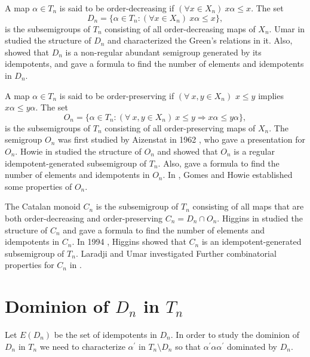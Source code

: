 \documentclass[10pt]{extarticle}
\numberwithin{equation}{section}
\numberwithin{bbb}{section}
\numberwithin{equation}{section}
\begin{document}
A map $\alpha \in T_n$ is said to be order-decreasing if $(\forall x \in X_n) \  x\alpha \leq x$. The set
$$D_n=\{\alpha \in T_n: (\forall x\in X_n) \ x\alpha\leq x\},$$ 
is the subsemigroups of $T_n$ consisting of all order-decreasing maps of $X_n$. Umar in \cite{15} studied the structure of $D_n$ and characterized the Green's relations in it. Also, showed that $D_n$ is a non-regular abundant semigroup generated by its idempotents, and gave a formula to find the number of elements and idempotents in $D_n$.

A map $\alpha \in T_n$ is said to be  order-preserving if $(\forall \ x,y \in X_n)$ $x \leq y$ implies $x\alpha \leq y\alpha$. The set
$$O_n=\{\alpha \in T_n: (\forall \ x,y\in X_n) \ x \leq y \Rightarrow x\alpha\leq y\alpha\},$$  
is the subsemigroups of $T_n$ consisting of all  order-preserving maps of $X_n$. The semigroup $O_n$ was first studied by Aizenstat in 1962 \cite{AZ}, who gave a presentation for $O_n$. Howie in \cite{pod} studied the structure of $O_n$ and showed that $O_n$ is a regular idempotent-generated subsemigroup of $T_n$. Also, gave a formula to find the number of elements and idempotents in $O_n$. In \cite{GM}, Gomes and Howie established some properties of $O_n$.

The Catalan monoid $C_n$ is the subsemigroup of $T_n$ consisting of all maps that are both order-decreasing and order-preserving  $C_n=D_n \cap O_n$. Higgins in \cite{HIG} studied the structure of $C_n$ and gave a formula to find the number of elements and idempotents in $C_n$. In 1994 \cite{HI}, Higgins showed that $C_n$ is an idempotent-generated subsemigroup of $T_n$. Laradji and Umar investigated Further combinatorial properties for $C_n$ in \cite{8}. 

\section{Dominion of $D_n$ in $T_n$}
\vspace{0.3cm}
Let $E(D_n)$ be the set of idempotents in $D_n$. In order to study the dominion of $D_n$ in $T_n$ we need to characterize $\alpha^{\prime}$ in $T_n \setminus D_n$ so that $\alpha^{\prime}\alpha\alpha^{\prime}$ dominated by $D_n$.
\end{document}
